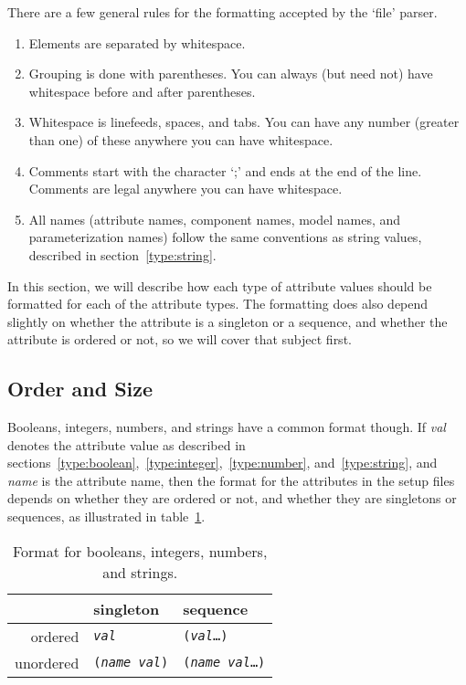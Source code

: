 There are a few general rules for the formatting accepted by the
`file' parser.  
\begin{enumerate}
\item Elements are separated by whitespace.
\item Grouping is done with parentheses.  You can always (but need
  not) have whitespace before and after parentheses.
\item Whitespace is linefeeds, spaces, and tabs.  You can have any
  number (greater than one) of these anywhere you can have whitespace.
\item Comments start with the character `;' and ends at the end of the
  line.  Comments are legal anywhere you can have whitespace.
\item All names (attribute names, component names, model names, and
  parameterization names) follow the same conventions as string
  values, described in section~\ref{type:string}.
\end{enumerate}

In this section, we will describe how each type of attribute values
should be formatted for each of the attribute types.  The formatting
does also depend slightly on whether the attribute is a singleton or
a sequence, and whether the attribute is ordered or not, so we will
cover that subject first.

\subsection{Order and Size}
\label{sec:order-size}

Booleans, integers, numbers, and strings have a common format though.
If \emph{val} denotes the attribute value as described in
sections~\ref{type:boolean},~\ref{type:integer},~\ref{type:number},
and~\ref{type:string}, and \emph{name} is the attribute name, then
the format for the attributes in the setup files depends on whether they
are ordered or not, and whether they are singletons or sequences, as
illustrated in table~\ref{tab:simple-types}.

\begin{table}[htbp]
  \begin{center}
    \begin{tabular}{|r|l|l|}\hline
                & singleton           
                & sequence \\\hline
      ordered   & \texttt{\emph{val}} 
                & \texttt{(\emph{val}\ldots{})} \\\hline
      unordered & \texttt{(\emph{name} \emph{val})}
                & \texttt{(\emph{name} \emph{val}\ldots{})}\\\hline
    \end{tabular}
  \end{center}
  \caption{Format for booleans, integers, numbers, and strings.}
  \label{tab:simple-types}
\end{table}

